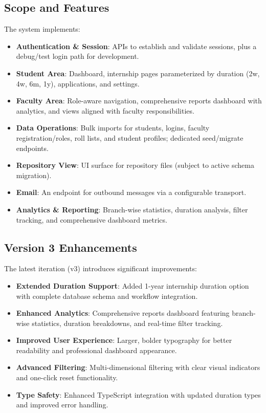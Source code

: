 \documentclass[conference]{IEEEtran}
\begin{document}
\subsection{Scope and Features}
The system implements:
\begin{itemize}[leftmargin=*,nosep]
  \item \textbf{Authentication \& Session}: APIs to establish and validate sessions, plus a debug/test login path for development.
  \item \textbf{Student Area}: Dashboard, internship pages parameterized by duration (2w, 4w, 6m, 1y), applications, and settings.
  \item \textbf{Faculty Area}: Role-aware navigation, comprehensive reports dashboard with analytics, and views aligned with faculty responsibilities.
  \item \textbf{Data Operations}: Bulk imports for students, logins, faculty registration/roles, roll lists, and student profiles; dedicated seed/migrate endpoints.
  \item \textbf{Repository View}: UI surface for repository files (subject to active schema migration).
  \item \textbf{Email}: An endpoint for outbound messages via a configurable transport.
  \item \textbf{Analytics \& Reporting}: Branch-wise statistics, duration analysis, filter tracking, and comprehensive dashboard metrics.
\end{itemize}

\subsection{Version 3 Enhancements}
The latest iteration (v3) introduces significant improvements:
\begin{itemize}[leftmargin=*,nosep]
  \item \textbf{Extended Duration Support}: Added 1-year internship duration option with complete database schema and workflow integration.
  \item \textbf{Enhanced Analytics}: Comprehensive reports dashboard featuring branch-wise statistics, duration breakdowns, and real-time filter tracking.
  \item \textbf{Improved User Experience}: Larger, bolder typography for better readability and professional dashboard appearance.
  \item \textbf{Advanced Filtering}: Multi-dimensional filtering with clear visual indicators and one-click reset functionality.
  \item \textbf{Type Safety}: Enhanced TypeScript integration with updated duration types and improved error handling.
\end{itemize}
\end{document}
